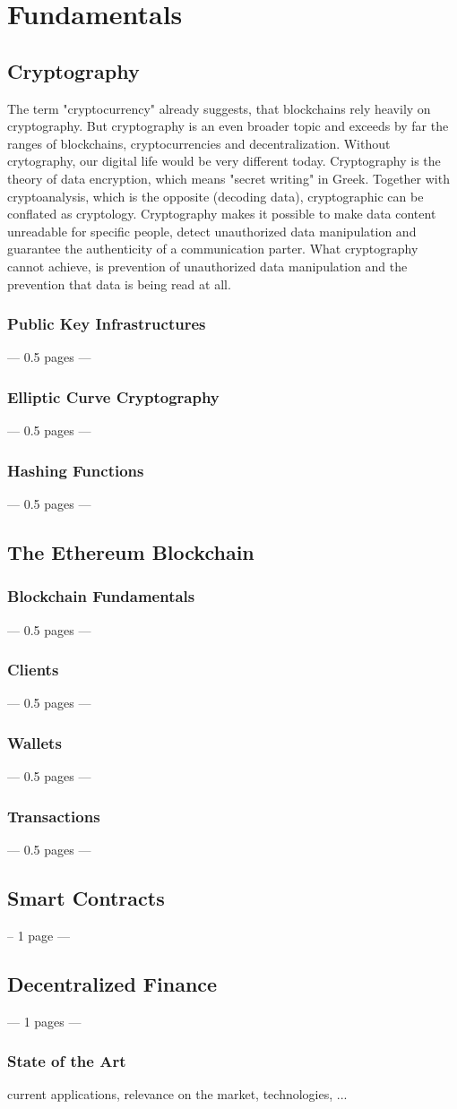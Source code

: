 \chapter{Fundamentals}
\label{cha:Fundamentals}

\section{Cryptography}

The term "cryptocurrency" already suggests, that blockchains rely heavily on cryptography. But cryptography is an even broader topic and exceeds by far the ranges of blockchains, cryptocurrencies and decentralization. Without crytography, our digital life would be very different today. Cryptography is the theory of data encryption, which means "secret writing" in Greek. Together with cryptoanalysis, which is the opposite (decoding data), cryptographic can be conflated as cryptology. Cryptography makes it possible to make data content unreadable for specific people, detect unauthorized data manipulation and guarantee the authenticity of a communication parter. What cryptography cannot achieve, is prevention of unauthorized data manipulation and the prevention that data is being read at all.

\subsection{Public Key Infrastructures}
--- 0.5 pages ---
\subsection{Elliptic Curve Cryptography}
--- 0.5 pages ---
\subsection{Hashing Functions}
--- 0.5 pages ---

\section{The Ethereum Blockchain}
\subsection{Blockchain Fundamentals}
--- 0.5 pages ---
\subsection{Clients}
--- 0.5 pages ---
\subsection{Wallets}
--- 0.5 pages ---
\subsection{Transactions}
--- 0.5 pages ---
\section{Smart Contracts}
-- 1 page ---
\section{Decentralized Finance}
--- 1 pages ---
\subsection{State of the Art}
current applications, relevance on the market, technologies, ...